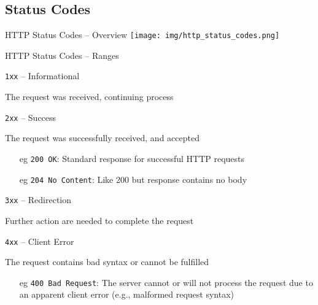 \documentclass[presentation]{beamer}\mode<presentation>{\usetheme{AMSBolognaFC}}
\begin{document}
\subsection{Status Codes}

\begin{frame}{HTTP Status Codes -- Overview}
    \texttt{[image: img/http\_status\_codes.png]}
\end{frame}

\begin{frame}[allowframebreaks]{HTTP Status Codes -- Ranges}
    \begin{block}{\texttt{1xx} -- Informational}
        \begin{center}
            The request was received, continuing process
        \end{center}
    \end{block}

    \begin{block}{\texttt{2xx} -- Success}
        \begin{center}
            The request was successfully received, and accepted
        \end{center}
        \begin{itemize}
            \item[eg] \alert{\texttt{200 OK}}: Standard response for successful HTTP requests

            \item[eg] \alert{\texttt{204 No Content}}: Like 200 but response contains \alert{no body}
        \end{itemize}
    \end{block}

    \begin{block}{\texttt{3xx} -- Redirection}
        \begin{center}
            Further action are needed to complete the request
        \end{center}
    \end{block}

    \begin{block}{\texttt{4xx} -- Client Error}
        \begin{center}
            The request contains bad syntax or cannot be fulfilled
        \end{center}
        \begin{itemize}
            \item[eg] \alert{\texttt{400 Bad Request}}: The server cannot or will not process the request due to an apparent client error (e.g., malformed request syntax)


\end{itemize}
\end{block}
\end{frame}
\end{document}
